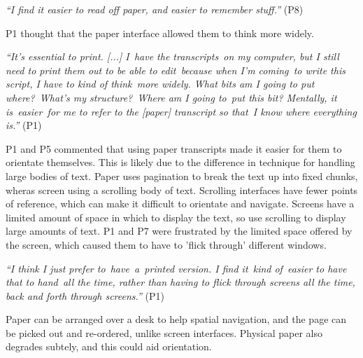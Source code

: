 


\textit{``I find it easier to read off paper, and easier to remember stuff.''} (P8)

P1 thought that the paper interface allowed them to think more widely.

\textit{``It's essential to print. [...]
I have the transcripts on my computer, but I still need to print them out to be able to edit because when I'm
coming to write this script, I have to kind of think more widely. What bits am I going to put where? What's my
structure? Where am I going to put this bit? Mentally, it is easier for me to refer to the [paper] transcript so
that I know where everything is.''} (P1)


P1 and P5 commented that using paper transcripts made it easier for them to orientate themselves. This is likely due to
the difference in technique for handling large bodies of text. Paper uses pagination to break the text up into fixed
chunks, wheras screen using a scrolling body of text. Scrolling interfaces have fewer points of reference, which can
make it difficult to orientate and navigate.
Screens have a limited amount of space in which to display the text, so use scrolling to display large amounts of text.
P1 and P7 were frustrated by the limited space offered by the screen, which caused them to have to 'flick through'
different windows.

\textit{``I think I just prefer to have a printed version. I find it kind of easier to have that to hand all the time,
rather than having to flick through screens all the time, back and forth through screens.''} (P1)

Paper can be arranged over a desk to help spatial navigation, and the page can be picked out and re-ordered, unlike
screen interfaces.
Physical paper also degrades subtely, and this could aid orientation.

